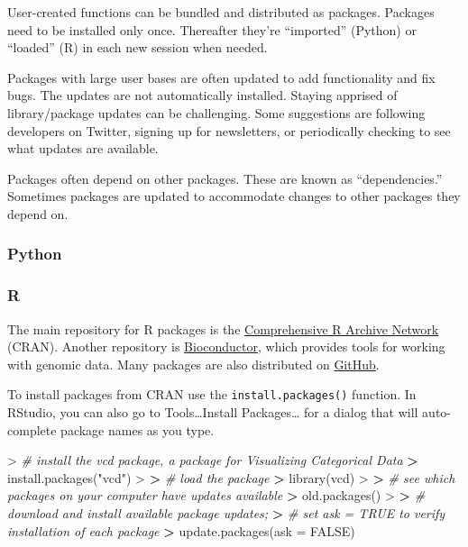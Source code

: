 \documentclass[
]{book}
\newenvironment{Shaded}{\begin{snugshade}}{\end{snugshade}}
\newcommand{\AttributeTok}[1]{\textcolor[rgb]{0.77,0.63,0.00}{#1}}
\newcommand{\CommentTok}[1]{\textcolor[rgb]{0.56,0.35,0.01}{\textit{#1}}}
\newcommand{\ConstantTok}[1]{\textcolor[rgb]{0.00,0.00,0.00}{#1}}
\newcommand{\ErrorTok}[1]{\textcolor[rgb]{0.64,0.00,0.00}{\textbf{#1}}}
\newcommand{\FunctionTok}[1]{\textcolor[rgb]{0.00,0.00,0.00}{#1}}
\newcommand{\NormalTok}[1]{#1}
\newcommand{\SpecialCharTok}[1]{\textcolor[rgb]{0.00,0.00,0.00}{#1}}
\newcommand{\StringTok}[1]{\textcolor[rgb]{0.31,0.60,0.02}{#1}}
\begin{document}
User-created functions can be bundled and distributed as packages. Packages need to be installed only once. Thereafter they're ``imported'' (Python) or ``loaded'' (R) in each new session when needed.

Packages with large user bases are often updated to add functionality and fix bugs. The updates are not automatically installed. Staying apprised of library/package updates can be challenging. Some suggestions are following developers on Twitter, signing up for newsletters, or periodically checking to see what updates are available.

Packages often depend on other packages. These are known as ``dependencies.'' Sometimes packages are updated to accommodate changes to other packages they depend on.

\hypertarget{python-3}{%
\subsubsection*{Python}\label{python-3}}

\hypertarget{r-3}{%
\subsubsection*{R}\label{r-3}}

The main repository for R packages is the \href{https://cran.r-project.org/}{Comprehensive R Archive Network} (CRAN). Another repository is \href{https://www.bioconductor.org/}{Bioconductor}, which provides tools for working with genomic data. Many packages are also distributed on \href{https://github.com/}{GitHub}.

To install packages from CRAN use the \texttt{install.packages()} function. In RStudio, you can also go to Tools\ldots Install Packages\ldots{} for a dialog that will auto-complete package names as you type.

\begin{Shaded}
\begin{Highlighting}[]
\SpecialCharTok{\textgreater{}} \CommentTok{\# install the vcd package, a package for Visualizing Categorical Data}
\ErrorTok{\textgreater{}} \FunctionTok{install.packages}\NormalTok{(}\StringTok{"vcd"}\NormalTok{)}
\SpecialCharTok{\textgreater{}} 
\ErrorTok{\textgreater{}} \CommentTok{\# load the package}
\ErrorTok{\textgreater{}} \FunctionTok{library}\NormalTok{(vcd)}
\SpecialCharTok{\textgreater{}} 
\ErrorTok{\textgreater{}} \CommentTok{\# see which packages on your computer have updates available}
\ErrorTok{\textgreater{}} \FunctionTok{old.packages}\NormalTok{()}
\SpecialCharTok{\textgreater{}} 
\ErrorTok{\textgreater{}} \CommentTok{\# download and install available package updates;}
\ErrorTok{\textgreater{}} \CommentTok{\# set ask = TRUE to verify installation of each package}
\ErrorTok{\textgreater{}} \FunctionTok{update.packages}\NormalTok{(}\AttributeTok{ask =} \ConstantTok{FALSE}\NormalTok{)}
\end{Highlighting}
\end{Shaded}
\end{document}
